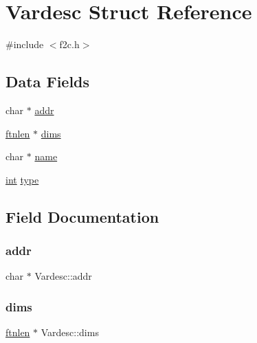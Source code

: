 \hypertarget{struct_vardesc}{}\section{Vardesc Struct Reference}
\label{struct_vardesc}


{\ttfamily \#include $<$f2c.\+h$>$}

\subsection*{Data Fields}
\begin{DoxyCompactItemize}
\item 
char $\ast$ \hyperlink{struct_vardesc_a6fb26e165999c54d5736ba1efca6dd18}{addr}
\item 
\hyperlink{dependencies_2third-party_2clapack_23_82_81_2_f2_c_l_i_b_s_2libf2c_2f2c_8h_a2ad57b5f7f73e0131623aa6dbff6d3f3}{ftnlen} $\ast$ \hyperlink{struct_vardesc_aec79f81e4e8543eb0536dfdba77dee3c}{dims}
\item 
char $\ast$ \hyperlink{struct_vardesc_af375ebb23b8ee48cb92ec4dc3b946bdb}{name}
\item 
\hyperlink{lp__lib_8h_adeb9ec6400320e4923ac9d836d509ddb}{int} \hyperlink{struct_vardesc_ac901f905f9cf2c9011684b7e612cc16c}{type}
\end{DoxyCompactItemize}


\subsection{Field Documentation}
\mbox{\label{struct_vardesc_a6fb26e165999c54d5736ba1efca6dd18}} 
\subsubsection{\texorpdfstring{addr}{addr}}
{\footnotesize\ttfamily char $\ast$ Vardesc\+::addr}

\mbox{\label{struct_vardesc_aec79f81e4e8543eb0536dfdba77dee3c}} 
\subsubsection{\texorpdfstring{dims}{dims}}
{\footnotesize\ttfamily \hyperlink{dependencies_2third-party_2clapack_23_82_81_2_f2_c_l_i_b_s_2libf2c_2f2c_8h_a2ad57b5f7f73e0131623aa6dbff6d3f3}{ftnlen} $\ast$ Vardesc\+::dims}

